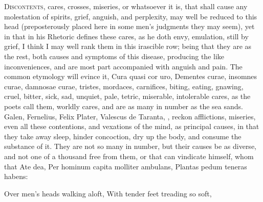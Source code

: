 {\lettrine{D}{iscontents}, cares, crosses, miseries, or whatsoever it is, that shall
cause any molestation of spirits, grief, anguish, and perplexity, may
well be reduced to this head (preposterously placed here in some men's
judgments they may seem), yet in that \Aristotle in his Rhetoric
defines these cares, as he doth envy, emulation, \etc{} still by grief, I
think I may well rank them in this irascible row; being that they are
as the rest, both causes and symptoms of this disease, producing the
like inconveniences, and are most part accompanied with anguish and
pain. The common etymology will evince it, Cura quasi cor uro, Dementes
curae, insomnes curae, damnosae curae, tristes, mordaces, carnifices,
\etc{} biting, eating, gnawing, cruel, bitter, sick, sad, unquiet, pale,
tetric, miserable, intolerable cares, as the poets call them,
worldly cares, and are as many in number as the sea sands. Galen,
Fernelius, Felix Plater, Valescus de Taranta, \etc{}, reckon afflictions,
miseries, even all these contentions, and vexations of the mind, as
principal causes, in that they take away sleep, hinder concoction, dry
up the body, and consume the substance of it. They are not so many in
number, but their causes be as diverse, and not one of a thousand free
from them, or that can vindicate himself, whom that Ate dea,
Per hominum capita molliter ambulans,
Plantas pedum teneras habens:

Over men's heads walking aloft,
With tender feet treading so soft,

}

